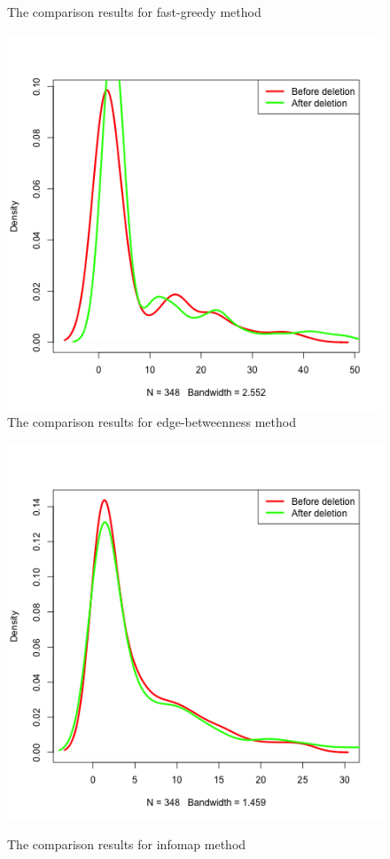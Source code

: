 \documentclass{article}
\begin{document}
\begin{figure}[htbp]
{\begin{minipage}[b]{0.4\textwidth}
\caption*{The comparison results for fast-greedy method}
\includegraphics[width=1\textwidth]{density_compare_ebc.png}\\
\caption*{The comparison results for edge-betweenness method}
\includegraphics[width=1\textwidth]{density_compare_ifc.png}
\caption*{The comparison results for infomap method}
\end{minipage}
}
\caption{}
\label{fig:p4_2}
\end{figure}
\end{document}
